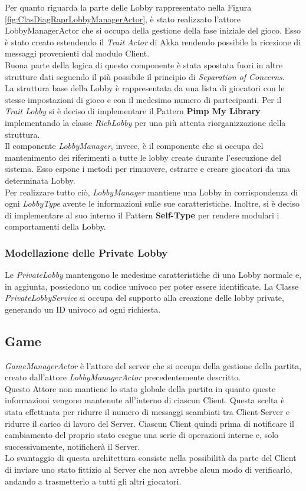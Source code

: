 Per quanto riguarda la parte delle Lobby rappresentato nella Figura \ref{fig:ClasDiagRaprLobbyManagerActor}, \`e stato realizzato l'attore LobbyManagerActor che si occupa della gestione della fase iniziale del gioco. Esso \`e stato creato estendendo il \textit{Trait Actor} di Akka rendendo possibile la ricezione di messaggi provenienti dal modulo Client.\\
Buona parte della logica di questo componente \`e stata spostata fuori in altre strutture dati seguendo il pi\`u possibile il principio di \textit{Separation of Concerns}.\\
La struttura base della Lobby \`e rappresentata da una lista di giocatori con le stesse impostazioni di gioco e con il medesimo numero di partecipanti. Per il \textit{Trait Lobby} si \`e deciso di implementare il Pattern \textbf{Pimp My Library} implementando la classe \textit{RichLobby} per una pi\`u attenta riorganizzazione della struttura.\\
Il componente \textit{LobbyManager}, invece, \`e il componente che si occupa del mantenimento dei riferimenti a tutte le lobby create durante l'esecuzione del sistema. Esso espone i metodi per rimuovere, estrarre e creare giocatori da una determinata Lobby.\\
Per realizzare tutto ci\`o, \textit{LobbyManager} mantiene una Lobby in corrispondenza di ogni \textit{LobbyType} avente le informazioni sulle sue caratteristiche. Inoltre, si \`e deciso di implementare al suo interno il Pattern \textbf{Self-Type} per rendere modulari i comportamenti della Lobby.

\subsubsection{Modellazione delle Private Lobby}
Le \textit{PrivateLobby} mantengono le medesime caratteristiche di una Lobby normale e, in aggiunta, possiedono un codice univoco per poter essere identificate.
La Classe \textit{PrivateLobbyService} si occupa del supporto alla creazione delle lobby private, generando un ID univoco ad ogni richiesta.

\subsection{Game}
\textit{GameManagerActor} \`e l'attore del server che si occupa della gestione della partita, creato dall'attore \textit{LobbyManagerActor} precedentemente descritto.\\
Questo Attore non mantiene lo stato globale della partita in quanto queste informazioni vengono mantenute all'interno di ciascun Client. Questa scelta \`e stata effettuata per ridurre il numero di messaggi scambiati tra Client-Server e ridurre il carico di lavoro del Server. Ciascun Client quindi prima di notificare il cambiamento del proprio stato esegue una serie di operazioni interne e, solo successivamente, notificher\`a il Server.\\
Lo svantaggio di questa architettura consiste nella possibilit\`a da parte del Client di inviare uno stato fittizio al Server che non avrebbe alcun modo di verificarlo, andando a trasmetterlo a tutti gli altri giocatori.

